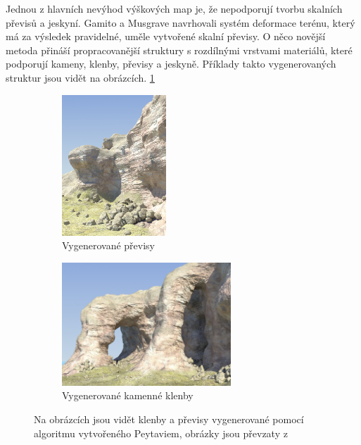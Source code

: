 Jednou z hlavních nevýhod výškových map je, že nepodporují tvorbu skalních převisů a jeskyní. Gamito a Musgrave \cite{Gamito2001ProceduralLW} navrhovali systém deformace terénu, který má za výsledek pravidelné, uměle vytvořené skalní převisy. O něco novější metoda \cite{Peytavie09} přináší propracovanější struktury s rozdílnými vrstvami materiálů, které podporují kameny, klenby, převisy a jeskyně. Příklady takto vygenerovaných struktur jsou vidět na obrázcích. \ref{PeytavieGen}

\begin{figure}[H]
	\centering
	\begin{subfigure}{0.475\textwidth}
		\centering
		\includegraphics[scale=1]{obrazky-figures/Overhang.png}
		\caption{Vygenerované převisy}
	\end{subfigure}
	\begin{subfigure}{0.475\textwidth}
		\centering
		\includegraphics[scale=1]{obrazky-figures/Arches.png}
		\caption{Vygenerované kamenné klenby}
	\end{subfigure}
	\caption{Na obrázcích jsou vidět klenby a převisy vygenerované pomocí algoritmu vytvořeného Peytaviem, obrázky jsou převzaty z \cite{Peytavie09}}
	\label{PeytavieGen}
\end{figure}

